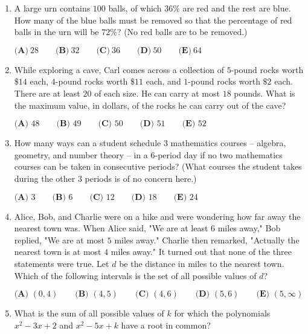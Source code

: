 \documentclass{article}
\begin{document}
\begin{enumerate}[label=\arabic*., itemsep=0.5em]
\item A large urn contains \(100\) balls, of which \(36 \%\) are red and the rest are blue. How many of the blue balls must be removed so that the percentage of red balls in the urn will be \(72 \%\)? (No red balls are to be removed.)

\( \textbf{(A)}\ 28 \qquad\textbf{(B)}\  32 \qquad\textbf{(C)}\  36 \qquad\textbf{(D)}\ 
 50 \qquad\textbf{(E)}\ 64 \)\par \vspace{0.5em}\item While exploring a cave, Carl comes across a collection of \(5\)-pound rocks worth \(\$14\) each, \(4\)-pound rocks worth \(\$11\) each, and \(1\)-pound rocks worth \(\$2\) each. There are at least \(20\) of each size. He can carry at most \(18\) pounds. What is the maximum value, in dollars, of the rocks he can carry out of the cave?

\(\textbf{(A) } 48 \qquad \textbf{(B) } 49 \qquad \textbf{(C) } 50 \qquad \textbf{(D) } 51 \qquad \textbf{(E) } 52 \)\par \vspace{0.5em}\item How many ways can a student schedule \(3\) mathematics courses -- algebra, geometry, and number theory -- in a \(6\)-period day if no two mathematics courses can be taken in consecutive periods? (What courses the student takes during the other \(3\) periods is of no concern here.)

\(\textbf{(A) }3\qquad\textbf{(B) }6\qquad\textbf{(C) }12\qquad\textbf{(D) }18\qquad\textbf{(E) }24\)\par \vspace{0.5em}\item Alice, Bob, and Charlie were on a hike and were wondering how far away the nearest town was. When Alice said, "We are at least \(6\) miles away," Bob replied, "We are at most \(5\) miles away." Charlie then remarked, "Actually the nearest town is at most \(4\) miles away." It turned out that none of the three statements were true. Let \(d\) be the distance in miles to the nearest town. Which of the following intervals is the set of all possible values of \(d\)?

\(\textbf{(A) }   (0,4)   \qquad        \textbf{(B) }   (4,5)   \qquad    \textbf{(C) }   (4,6)   \qquad   \textbf{(D) }  (5,6)  \qquad  \textbf{(E) }   (5,\infty) \)\par \vspace{0.5em}\item What is the sum of all possible values of \(k\) for which the polynomials \(x^2 - 3x + 2\) and \(x^2 - 5x + k\) have a root in common?


\end{enumerate}
\end{document}
